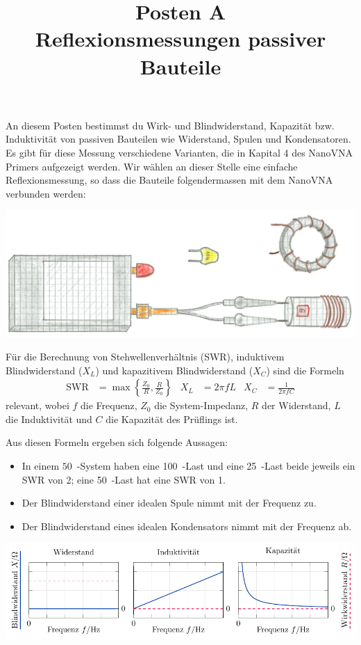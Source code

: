 \documentclass[a4paper,11pt,parskip=half,headings=small,DIV=11,notitlepage,abstract=on]{scrartcl}
\title{Posten A\\ Reflexionsmessungen passiver Bauteile}
\author{}
\date{}
\begin{document}
\maketitle
\vspace{-2cm}

An diesem Posten bestimmst du Wirk- und Blindwiderstand, Kapazität bzw. Induktivität von passiven Bauteilen wie Widerstand, Spulen und Kondensatoren. Es gibt für diese Messung verschiedene Varianten, die in Kapital 4 des NanoVNA Primers aufgezeigt werden. Wir wählen an dieser Stelle eine einfache Reflexionsmessung, so dass die Bauteile folgendermassen mit dem NanoVNA verbunden werden:

\begin{center}\includegraphics[width=.65\textwidth]{../skript/figures/illustration_impedance.png}\end{center}

Für die Berechnung von Stehwellenverhältnis (SWR), induktivem Blindwiderstand ($X_L$) und kapazitivem Blindwiderstand ($X_C$) sind die Formeln
\begin{align*}
    \text{SWR} &= \max\left\{\frac{Z_0}{R}, \frac{R}{Z_0}\right\} & X_L &= 2\pi f L & X_C &= \frac{1}{2\pi f C}
\end{align*}
relevant, wobei $f$ die Frequenz, $Z_0$ die System-Impedanz, $R$ der Widerstand, $L$ die Induktivität und $C$ die Kapazität des Prüflings ist.

Aus diesen Formeln ergeben sich folgende Aussagen:
\begin{itemize}
    \item In einem $50$~\Ohm-System haben eine 100~\Ohm-Last und eine 25~\Ohm-Last beide jeweils ein SWR von 2; eine 50~\Ohm-Last hat eine SWR von 1.
    \item Der Blindwiderstand einer idealen Spule nimmt mit der Frequenz zu.
    \item Der Blindwiderstand eines idealen Kondensators nimmt mit der Frequenz ab.
\end{itemize}
\includegraphics[width=\textwidth]{../skript/figures/reactance/reactance.pdf}
\end{document}
